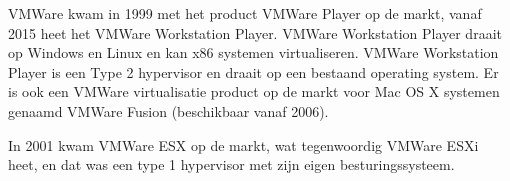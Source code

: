 VMWare kwam in 1999 met het product VMWare Player op de markt, vanaf 2015 heet het VMWare Workstation Player. VMWare Workstation Player draait op Windows en Linux en kan x86 systemen virtualiseren. VMWare Workstation Player is een Type 2 hypervisor en draait op een bestaand operating system. Er is ook een VMWare virtualisatie product op de markt voor Mac OS X systemen genaamd VMWare Fusion (beschikbaar vanaf 2006).

In 2001 kwam VMWare ESX op de markt, wat tegenwoordig VMWare ESXi heet, en dat was een type 1 hypervisor met zijn eigen besturingssysteem.

